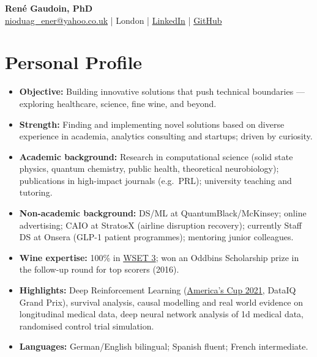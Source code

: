 \documentclass[11pt,a4paper]{article}
\begin{document}
\begin{center}
    {\LARGE\bfseries René Gaudoin, PhD}\\[4pt]
    \href{mailto:nioduag_ener@yahoo.co.uk}{nioduag\_ener@yahoo.co.uk} \quad | \quad London \quad | \quad \href{https://www.linkedin.com/in/renegaudoin/}{LinkedIn} \quad | \quad \href{https://github.com/RGaudoin}{GitHub}
\end{center}

\section*{Personal Profile}

\begin{itemize}[leftmargin=*, nosep, itemsep=3pt]
    \item \textbf{Objective:} Building innovative solutions that push technical boundaries --- exploring healthcare, science, fine wine, and beyond.

    \item \textbf{Strength:} Finding and implementing novel solutions based on diverse experience in academia, analytics consulting and startups; driven by curiosity.

    \item \textbf{Academic background:} Research in computational science (solid state physics, quantum chemistry, public health, theoretical neurobiology); publications in high-impact journals (e.g.\ PRL); university teaching and tutoring.

    \item \textbf{Non-academic background:} DS/ML at QuantumBlack/McKinsey; online advertising; CAIO at StratosX (airline disruption recovery); currently Staff DS at Onsera (GLP-1 patient programmes); mentoring junior colleagues.

    \item \textbf{Wine expertise:} 100\% in \href{https://www.wsetglobal.com/}{WSET 3}; won an Oddbins Scholarship prize in the follow-up round for top scorers (2016).

    \item \textbf{Highlights:} Deep Reinforcement Learning (\href{https://www.linkedin.com/posts/renegaudoin_flying-across-the-sea-propelled-by-ai-activity-6775211288747360256-ADsM}{America's Cup 2021}, DataIQ Grand Prix), survival analysis, causal modelling and real world evidence on longitudinal medical data, deep neural network analysis of 1d medical data, randomised control trial simulation.

    \item \textbf{Languages:} German/English bilingual; Spanish fluent; French intermediate.

\end{itemize}
\end{document}

